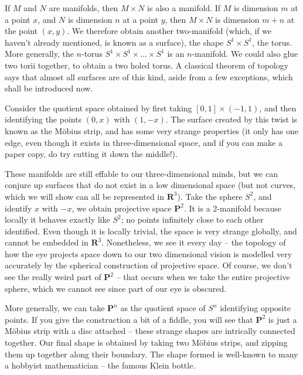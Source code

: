 \documentclass[12pt]{report}
\theoremstyle{plain}
\theoremstyle{definition}
\begin{document}

If $M$ and $N$ are manifolds, then $M \times N$ is also a manifold. If $M$ is dimension $m$ at a point $x$, and $N$ is dimension $n$ at a point $y$, then $M \times N$ is dimension $m + n$ at the point $(x,y)$. We therefore obtain another two-manifold (which, if we haven't already mentioned, is known as a surface), the shape $S^1 \times S^1$, the torus. More generally, the $n$-torus $S^1 \times S^1 \times \dots \times S^1$ is an $n$-manifold. We could also glue two torii together, to obtain a two holed torus. A classical theorem of topology says that almost all surfaces are of this kind, aside from a few exceptions, which shall be introduced now.

Consider the quotient space obtained by first taking $[0,1] \times (-1,1)$, and then identifying the points $(0,x)$ with $(1,-x)$. The surface created by this twist is known as the M\"{o}bius strip, and has some very strange properties (it only has one edge, even though it exists in three-dimensional space, and if you can make a paper copy, do try cutting it down the middle!).


These manifolds are still effable to our three-dimensional minds, but we can conjure up surfaces that do not exist in a low dimensional space (but not curves, which we will show can all be represented in $\mathbf{R}^3$). Take the sphere $S^2$, and identify $x$ with $-x$, we obtain projective space $\mathbf{P}^2$. It is a 2-manifold because locally it behaves exactly like $S^2$; no points infinitely close to each other identified. Even though it is locally trivial, the space is very strange globally, and cannot be embedded in $\mathbf{R}^3$. Nonetheless, we see it every day -- the topology of how the eye projects space down to our two dimensional vision is modelled very accurately by the spherical construction of projective space. Of course, we don't see the really weird part of $\mathbf{P}^2$ -- that occurs when we take the entire projective sphere, which we cannot see since part of our eye is obscured.

More generally, we can take $\mathbf{P}^n$ as the quotient space of $S^{n}$ identifying opposite points. If you give the construction a bit of a fiddle, you will see that $\mathbf{P}^2$ is just a M\"{o}bius strip with a disc attached -- these strange shapes are intrically connected together. Our final shape is obtained by taking two M\"{o}bius strips, and zipping them up together along their boundary. The shape formed is well-known to many a hobbyist mathematician -- the famous Klein bottle.
\end{document}

